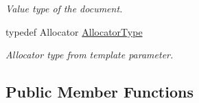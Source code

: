 \begin{DoxyCompactItemize}
\begin{DoxyCompactList}\small\item\em Value type of the document. \end{DoxyCompactList}\item 
typedef Allocator \hyperlink{class_generic_document_a35155b912da66ced38d22e2551364c57}{Allocator\+Type}\hypertarget{class_generic_document_a35155b912da66ced38d22e2551364c57}{}\label{class_generic_document_a35155b912da66ced38d22e2551364c57}

\begin{DoxyCompactList}\small\item\em Allocator type from template parameter. \end{DoxyCompactList}\end{DoxyCompactItemize}
\subsection*{Public Member Functions}
